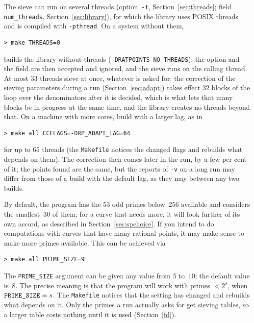 \documentclass[12pt,a4paper,oneside]{amsart}
\begin{document}
The sieve can run on several threads (option~\verb+-t+,
Section~\ref{sec:threads}; field \texttt{num\_threads},
Section~\ref{sec:library}), for which the library uses POSIX threads and
is compiled with \verb+-pthread+. On a system without them,
\begin{verbatim}
> make THREADS=0
\end{verbatim}
builds the library without threads (\verb+-DRATPOINTS_NO_THREADS+); the
option and the field are then accepted and ignored, and the sieve runs on
the calling thread. At most $33$ threads sieve at once,
whatever is asked for: the correction of the sieving parameters during a
run (Section~\ref{sec:adapt}) takes effect $32$ blocks of the loop over
the denominators after it is decided, which is what lets that many blocks
be in progress at the same time, and the library creates no threads
beyond that. On a machine with more cores, build with a larger lag, as in
\begin{verbatim}
> make all CCFLAGS=-DRP_ADAPT_LAG=64
\end{verbatim}
for up to $65$ threads (the \texttt{Makefile} notices the changed flags
and rebuilds what depends on them). The correction then comes later in the run, by a
few per cent of it; the points found are the same, but the reports of
\verb+-v+ on a long run may differ from those of a build with the
default lag, as they may between any two builds.

By default, the program has the $53$ odd primes below~$256$ available and
considers the smallest~$30$ of them; for a curve that needs more, it will
look further of its own accord, as described in Section~\ref{sec:spchoice}.
If you intend to do computations with curves that have many rational points,
it may make sense to make more primes available. This can be achieved via

\begin{verbatim}
> make all PRIME_SIZE=9
\end{verbatim}

The \texttt{PRIME\_SIZE} argument can be given any value from 5 to~10;
the default value is~8. The precise meaning is that the program will
work with primes $< 2^s$, when $\text{\texttt{PRIME\_SIZE}} = s$. The
\texttt{Makefile} notices that the setting has changed and rebuilds what
depends on it. Only the primes a run actually asks for get sieving tables,
so a larger table costs nothing until it is used (Section~\ref{fd}).
\end{document}
